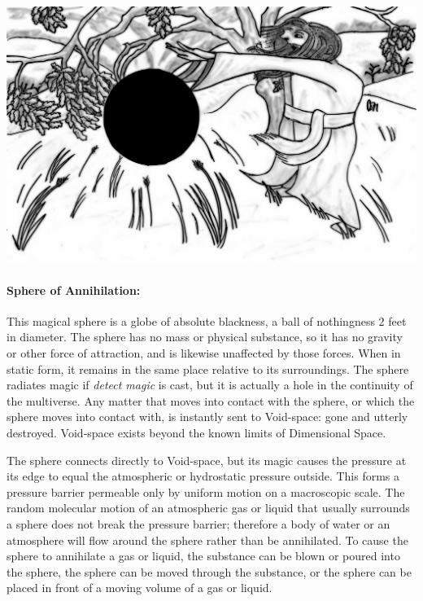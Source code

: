 \begin{multicols}{2}
\vspace{0.5em}

\begin{center}

\noindent\includegraphics[width=0.95\columnwidth]{sphereofannihilation.pdf}\label{sphereofannihilation}

\end{center}

\paragraph{Sphere of Annihilation:} This magical sphere is a globe of absolute blackness, a ball of nothingness 2 feet in diameter.  The sphere has no mass or physical substance, so it has no gravity or other force of attraction, and is likewise unaffected by those forces.  When in static form, it remains in the same place relative to its surroundings.  The sphere radiates magic if \textit{detect magic} is cast, but it is actually a hole in the continuity of the multiverse.  Any matter that moves into contact with the sphere, or which the sphere moves into contact with, is instantly sent to Void-space: gone and utterly destroyed.  Void-space exists beyond the known limits of Dimensional Space.  

The sphere connects directly to Void-space, but its magic causes the pressure at its edge to equal the atmospheric or hydrostatic pressure outside.  This forms a pressure barrier permeable only by uniform motion on a macroscopic scale.  The random molecular motion of an atmospheric gas or liquid that usually surrounds a sphere does not break the pressure barrier; therefore a body of water or an atmosphere will flow around the sphere rather than be annihilated.  To cause the sphere to annihilate a gas or liquid, the substance can be blown or poured into the sphere, the sphere can be moved through the substance, or the sphere can be placed in front of a moving volume of a gas or liquid.    


\end{multicols}
